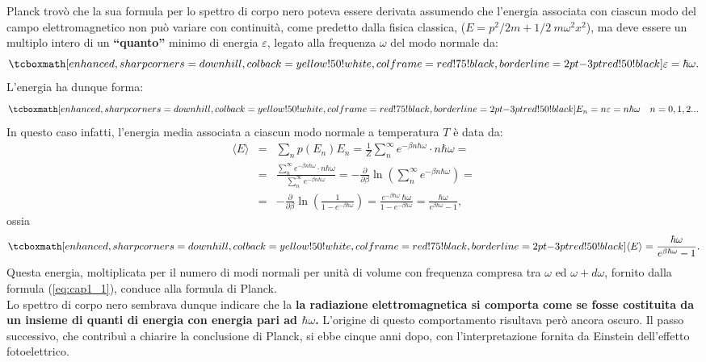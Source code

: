 Planck trovò che la sua formula  per lo spettro di corpo nero poteva essere derivata assumendo che l'energia associata con ciascun modo del campo elettromagnetico non può variare con continuità, come predetto dalla fisica classica, ($E= p^2/2m +1/2 \ m \omega ^2 x^2$), ma deve essere un multiplo intero di un \textbf{``quanto''} minimo di energia $\varepsilon$, legato alla frequenza $\omega$ del modo normale da:
	\begin{equation}
		\tcboxmath[enhanced,sharp corners=downhill ,colback=yellow!50!white,colframe=red!75!black, borderline={2pt}{-3pt}{red!50!black}]{
			\varepsilon = \hbar \omega .
			}
	\end{equation}
L'energia ha dunque forma:
	\begin{equation}
	\tcboxmath[enhanced,sharp corners=downhill ,colback=yellow!50!white,colframe=red!75!black, borderline={2pt}{-3pt}{red!50!black}]{
		E_n = n\varepsilon = n \hbar \omega \quad n= 0,1,2...
		}
\end{equation}
In questo caso infatti, l'energia media associata a ciascun modo normale a temperatura $T$ è data da:
	\begin{eqnarray}
		\langle E \rangle &=&\sum _n p(E_n) E_n =\frac{1}{Z}\sum _n ^{\infty} e^{-\beta n \hbar \omega} \cdot n\hbar \omega = \nonumber \\
		&=&\frac{\sum _n ^{\infty} e^{-\beta n \hbar \omega} \cdot n\hbar \omega}{\sum _n ^{\infty} e^{-\beta n \hbar \omega}}= - \frac{\partial}{\partial \beta} \ln \left( \sum _n ^{\infty} e^{-\beta n \hbar \omega}\right)= \nonumber \\
		&=&- \frac{\partial}{\partial \beta} \ln \left( \frac{1}{1- e^{-\beta \hbar \omega}}\right)=  \frac{e^{-\beta \hbar \omega}\ \hbar \omega}{1-e^{-\beta \hbar \omega}}= \frac{ \hbar \omega}{e^{\beta \hbar \omega}-1},
	\end{eqnarray}
ossia
	\begin{equation}
		\tcboxmath[enhanced,sharp corners=downhill ,colback=yellow!50!white,colframe=red!75!black, borderline={2pt}{-3pt}{red!50!black}]{
			\langle E \rangle = \frac{ \hbar \omega}{e^{\beta \hbar \omega}-1}.
			}
	\end{equation}
Questa energia, moltiplicata per il numero di modi normali per unità di volume con frequenza compresa tra $\omega$ ed $\omega + d\omega$, fornito dalla formula (\ref{eq:cap1_1}), conduce alla formula di Planck.\\

Lo spettro di corpo nero sembrava dunque indicare che la \textbf{la radiazione elettromagnetica si comporta come se fosse costituita da un insieme di quanti di energia con energia pari ad $\hbar \omega $.}
L'origine di questo comportamento risultava però ancora oscuro. Il passo successivo, che contribuì a chiarire la conclusione di Planck, si ebbe cinque anni dopo, con l'interpretazione fornita da Einstein dell'effetto fotoelettrico.
